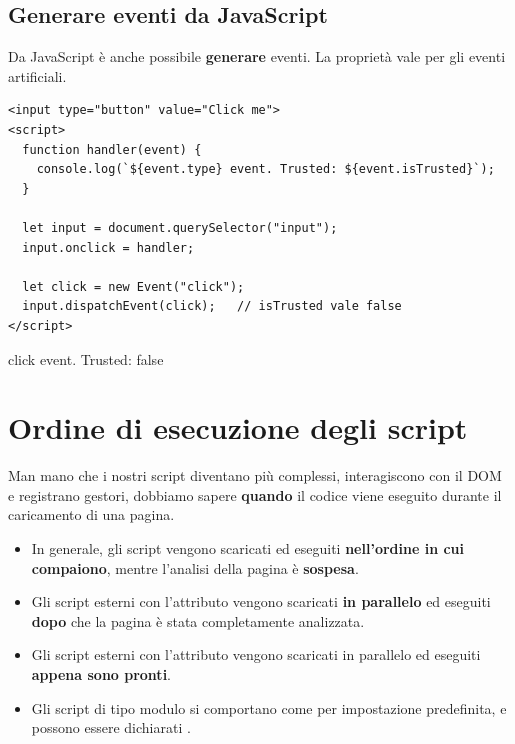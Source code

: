 
\subsection{Generare eventi da JavaScript}

Da JavaScript è anche possibile \textbf{generare} eventi. La proprietà
 vale  per gli eventi artificiali.

\begin{affianco}[0.6][c]
\begin{lstlisting}[style=html, name=dispatch.html]
<input type="button" value="Click me">
<script>
  function handler(event) {
    console.log(`${event.type} event. Trusted: ${event.isTrusted}`);
  }

  let input = document.querySelector("input");
  input.onclick = handler;

  let click = new Event("click");
  input.dispatchEvent(click);   // isTrusted vale false
</script>
\end{lstlisting}
\risultato
\begin{console}
click event. Trusted: false
\end{console}
\end{affianco}

\section{Ordine di esecuzione degli script}

Man mano che i nostri script diventano più complessi, interagiscono con il DOM e
registrano gestori, dobbiamo sapere \textbf{quando} il codice viene eseguito
durante il caricamento di una pagina.

\begin{itemize}
  \item In generale, gli script vengono scaricati ed eseguiti \textbf{nell'ordine
        in cui compaiono}, mentre l'analisi della pagina è \textbf{sospesa}.
  \item Gli script esterni con l'attributo  vengono scaricati
        \textbf{in parallelo} ed eseguiti \textbf{dopo} che la pagina è stata
        completamente analizzata.
  \item Gli script esterni con l'attributo  vengono scaricati in
        parallelo ed eseguiti \textbf{appena sono pronti}.
  \item Gli script di tipo modulo si comportano come  per
        impostazione predefinita, e possono essere dichiarati .
\end{itemize}

